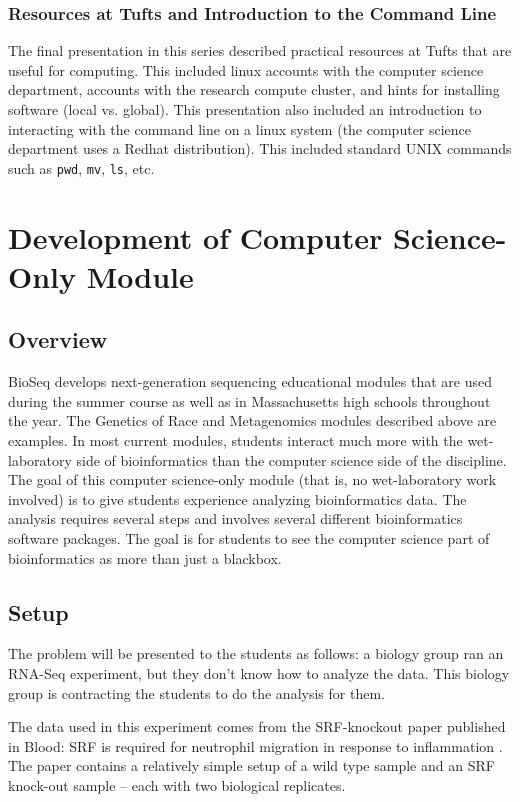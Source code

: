 \documentclass{report}
\begin{document}
\subsection{Resources at Tufts and Introduction to the Command Line}
The final presentation in this series described practical resources at Tufts that are useful for computing. This included linux accounts with the computer science department, accounts with the research compute cluster, and hints for installing software (local vs. global). This presentation also included an introduction to interacting with the command line on a linux system (the computer science department uses a Redhat distribution). This included standard UNIX commands such as \texttt{pwd}, \texttt{mv}, \texttt{ls}, etc.


\chapter{Development of Computer Science-Only Module}
\section{Overview}
BioSeq develops next-generation sequencing educational modules that are used during the summer course as well as in  Massachusetts high schools throughout the year. The Genetics of Race and Metagenomics modules described above are examples. In most current modules, students interact much more with the wet-laboratory side of bioinformatics than the computer science side of the discipline. The goal of this computer science-only module (that is, no wet-laboratory work involved) is to give students experience analyzing bioinformatics data. The analysis requires several steps and involves several different bioinformatics software packages. The goal is for students to see the computer science part of bioinformatics as more than just a blackbox.

\section{Setup}
The problem will be presented to the students as follows: a biology group ran an RNA-Seq experiment, but they don't know how to analyze the data. This biology group is contracting the students to do the analysis for them. 

The data used in this experiment comes from the SRF-knockout paper published in Blood: SRF is required for neutrophil migration in response to inflammation \cite{taylor2014srf}. The paper contains a relatively simple setup of a wild type sample and an SRF knock-out sample -- each with two biological replicates.
\end{document}
